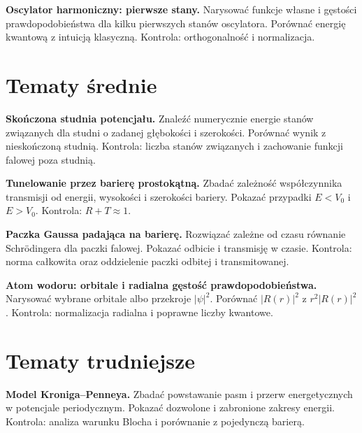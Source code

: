 \begin{exercisebox}
\textbf{Oscylator harmoniczny: pierwsze stany.}
Narysować funkcje własne i gęstości prawdopodobieństwa dla kilku pierwszych
stanów oscylatora. Porównać energię kwantową z intuicją klasyczną. Kontrola:
orthogonalność i normalizacja.
\end{exercisebox}

\section{Tematy średnie}

\begin{exercisebox}
\textbf{Skończona studnia potencjału.}
Znaleźć numerycznie energie stanów związanych dla studni o zadanej głębokości i
szerokości. Porównać wynik z nieskończoną studnią. Kontrola: liczba stanów
związanych i zachowanie funkcji falowej poza studnią.
\end{exercisebox}

\begin{exercisebox}
\textbf{Tunelowanie przez barierę prostokątną.}
Zbadać zależność współczynnika transmisji od energii, wysokości i szerokości
bariery. Pokazać przypadki \(E<V_0\) i \(E>V_0\). Kontrola: \(R+T\approx1\).
\end{exercisebox}

\begin{exercisebox}
\textbf{Paczka Gaussa padająca na barierę.}
Rozwiązać zależne od czasu równanie Schrödingera dla paczki falowej. Pokazać
odbicie i transmisję w czasie. Kontrola: norma całkowita oraz oddzielenie paczki
odbitej i transmitowanej.
\end{exercisebox}

\begin{exercisebox}
\textbf{Atom wodoru: orbitale i radialna gęstość prawdopodobieństwa.}
Narysować wybrane orbitale albo przekroje \(|\psi|^2\). Porównać \(|R(r)|^2\) z
\(r^2|R(r)|^2\). Kontrola: normalizacja radialna i poprawne liczby kwantowe.
\end{exercisebox}

\section{Tematy trudniejsze}

\begin{exercisebox}
\textbf{Model Kroniga--Penneya.}
Zbadać powstawanie pasm i przerw energetycznych w potencjale periodycznym.
Pokazać dozwolone i zabronione zakresy energii. Kontrola: analiza warunku
Blocha i porównanie z pojedynczą barierą.
\end{exercisebox}

